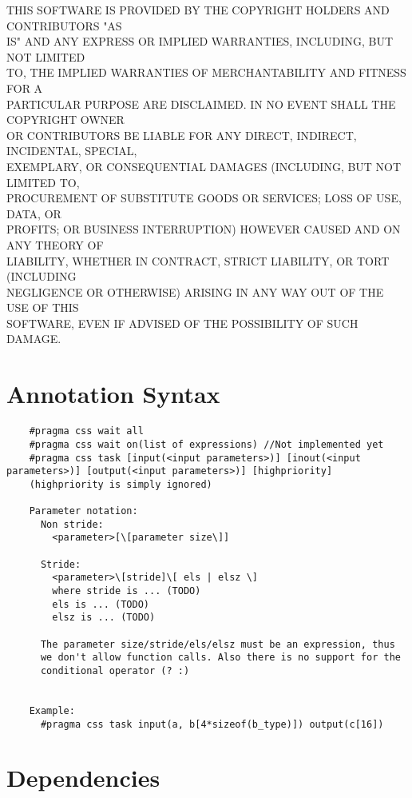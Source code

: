 \documentclass[letterpaper]{article}
\begin{document}
THIS SOFTWARE IS PROVIDED BY THE COPYRIGHT HOLDERS AND CONTRIBUTORS "AS\\
IS" AND ANY EXPRESS OR IMPLIED WARRANTIES, INCLUDING, BUT NOT LIMITED\\
TO, THE IMPLIED WARRANTIES OF MERCHANTABILITY AND FITNESS FOR A\\
PARTICULAR PURPOSE ARE DISCLAIMED. IN NO EVENT SHALL THE COPYRIGHT OWNER\\
OR CONTRIBUTORS BE LIABLE FOR ANY DIRECT, INDIRECT, INCIDENTAL, SPECIAL,\\
EXEMPLARY, OR CONSEQUENTIAL DAMAGES (INCLUDING, BUT NOT LIMITED TO,\\
PROCUREMENT OF SUBSTITUTE GOODS OR SERVICES; LOSS OF USE, DATA, OR\\
PROFITS; OR BUSINESS INTERRUPTION) HOWEVER CAUSED AND ON ANY THEORY OF\\
LIABILITY, WHETHER IN CONTRACT, STRICT LIABILITY, OR TORT (INCLUDING\\
NEGLIGENCE OR OTHERWISE) ARISING IN ANY WAY OUT OF THE USE OF THIS\\
SOFTWARE, EVEN IF ADVISED OF THE POSSIBILITY OF SUCH DAMAGE.\\

\section{Annotation Syntax}

\begin{verbatim}
    #pragma css wait all
    #pragma css wait on(list of expressions) //Not implemented yet
    #pragma css task [input(<input parameters>)] [inout(<input parameters>)] [output(<input parameters>)] [highpriority]
    (highpriority is simply ignored)

    Parameter notation:
      Non stride:
        <parameter>[\[parameter size\]]
      
      Stride:
        <parameter>\[stride]\[ els | elsz \]
        where stride is ... (TODO)
        els is ... (TODO)
        elsz is ... (TODO)

      The parameter size/stride/els/elsz must be an expression, thus
      we don't allow function calls. Also there is no support for the
      conditional operator (? :)
      

    Example:
      #pragma css task input(a, b[4*sizeof(b_type)]) output(c[16])
\end{verbatim}


\section{Dependencies}
\end{document}
